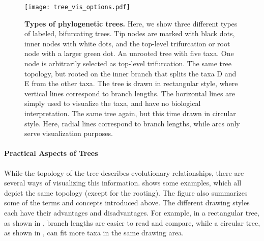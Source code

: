\begin{figure}[thb]
    \centering
    \texttt{[image: tree\_vis\_options.pdf]}
    \begin{subfigure}{0pt}
        \label{fig:tree_vis_options:sub:unrooted}
    \end{subfigure}
    \begin{subfigure}{0pt}
        \label{fig:tree_vis_options:sub:rectangular}
    \end{subfigure}
    \begin{subfigure}{0pt}
        \label{fig:tree_vis_options:sub:circular}
    \end{subfigure}
    \caption[Types of phylogenetic trees]{
        \textbf{Types of phylogenetic trees.}
        Here, we show three different types of labeled, bifurcating trees.
        Tip nodes are marked with black dots, inner nodes with white dots,
        and the top-level trifurcation or root node with a larger green dot.
        An unrooted tree with five taxa. One node is arbitrarily selected as top-level trifurcation.
        The same tree topology,
        but rooted on the inner branch that splits the taxa {\sffamily D} and {\sffamily E} from the other taxa.
        The tree is drawn in rectangular style,
        where vertical lines correspond to branch lengths.
        The horizontal lines are simply used to visualize the taxa, and have no biological interpretation.
        The same tree again, but this time drawn in circular style.
        Here, radial lines correspond to branch lengths, while arcs only serve visualization purposes.
    }
    \label{fig:tree_vis_options}
\end{figure}

\paragraph{Practical Aspects of Trees}
\label{ch:Foundations:sec:TreeOfLife:sub:PhylogeneticTrees:par:PracticalAspects}

While the topology of the tree describes evolutionary relationships,
there are several ways of visualizing this information.
 shows some examples, which all depict the same topology (except for the rooting).
The figure also summarizes some of the terms and concepts introduced above.
The different drawing styles each have their advantages and disadvantages.
For example, in a rectangular tree, as shown in ,
branch lengths are easier to read and compare,
while a circular tree, as shown in , can fit more taxa in the same drawing area.

